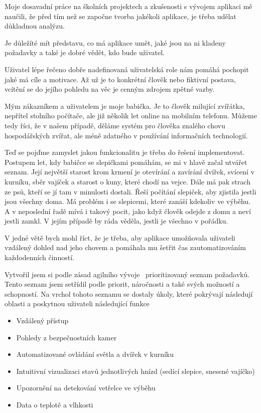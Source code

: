 Moje dosavadní práce na školních projektech a zkušenosti s vývojem aplikaci mě naučili, že před tím než se započne tvorba jakékoli aplikace, je třeba udělat důkladnou analýzu.

Je důležíté mít představu, co má aplikace umět, jaké jsou na ni kladeny požadavky a také je dobré vědět, kdo bude uživatel.

Uživatel lépe řečeno dobře nadefinovaná uživatelská role nám pomáhá pochopit jaké má cíle a motivace.
Až už je to konkrétní člověk nebo fiktivní postava, vcítění se do jejího pohledu na věc je cenným zdrojem zpětné vazby.

Mým zákazníkem a uživatelem je moje babička.
Je to člověk milující zvířátka, nepřítel stolního počítače, ale již několik let online na mobilním telefonu.
Můžeme tedy říci, že v našem případě, děláme systém pro člověka znalého chovu hospodářských zvířat, ale méně zdatného v používání informačních technologií.

Teď se pojďme zamyslet jakou funkcionalitu je třeba do řešení implementovat.
Postupem let, kdy babičce se slepičkami pomáhám, se mi v hlavě začal utvářet seznam.
Její největší starost krom krmení je otevírání a zavírání dvířek, svícení v kurníku, sběr vajíček a starost o kuny, které chodí na vejce.
Dále má pak strach ze psů, kteří se jí tam v minulosti dostali.
Řeší počítání slepiček, aby zjistila jestli jsou všechny doma.
Má problém i se slepicemi, které zanáší kdekoliv ve výběhu.
A v neposlední řadě mívá i takový pocit, jako když člověk odejde z domu a neví jestli zamkl.
V jejím případě by ráda věděla, jestli je všechno v pořádku.

V jedné větě bych mohl říct, že je třeba, aby aplikace umožňovala uživateli vzdálený dohled nad jeho chovem a pomáhala mu šetřit čas zautomatizováním každodenních činností.

Vytvořil jsem si podle zásad agilního vývoje~\cite{agile-manifesto} prioritizovaný seznam požadavků.
Tento seznam jsem setřídil podle priorit, náročnosti a také svých možností a schopností.
Na vrchol tohoto seznamu se dostaly úkoly, které pokrývají následují oblasti a poskytnou uživateli následující funkce

\begin{itemize}
    \item Vzdálený přístup
    \item Pohledy z bezpečnostních kamer
    \item Automatizované ovládání světla a dvířek v kurníku
    \item Intuitivní vizualizaci stavů jednotlivých hnízd (sedící slepice, snesené vajíčko)
    \item Upozornění na detekování vetřelce ve výběhu
    \item Data o teplotě a vlhkosti
\end{itemize}


\newpage